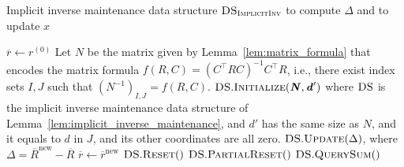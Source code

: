 \documentclass[11pt]{article}
\newcommand{\new}{\mathrm{new}}
\newcommand\dd{\boldsymbol{\mathit{d}}}
\newcommand\rr{\boldsymbol{\mathit{r}}}
\newcommand\xx{\boldsymbol{\mathit{x}}}
\newcommand\CC{\boldsymbol{\mathit{C}}}
\newcommand\NN{\boldsymbol{\mathit{N}}}
\newcommand\RR{\boldsymbol{\mathit{R}}}
\newcommand{\ov}{\overline}
\begin{document}
\begin{algorithm}
\caption{Implicit inverse maintenance data structure $\textsc{DS}_{\textsc{ImplicitInv}}$ to compute $\Delta$ and to update $\xx$}\label{alg:DS_Implicit_Inv}
\begin{algorithmic}[1]
\State $\ov{\rr} \leftarrow \rr^{(0)}$
\State Let $\NN$ be the matrix given by Lemma~\ref{lem:matrix_formula} that encodes the matrix formula $f(\RR, \CC) = (\CC^{\top} \RR \CC)^{-1} \CC^{\top} \RR$, i.e., there exist index sets $I,J$ such that $(\NN^{-1})_{I,J} = f(\RR, \CC)$.
\State $\textsc{DS}.\textsc{Initialize}(\NN, \dd')$ where $\textsc{DS}$ is the implicit inverse maintenance data structure of Lemma~\ref{lem:implicit_inverse_maintenance}, and $\dd'$ has the same size as $\NN$, and it equals to $\dd$ in $J$, and its other coordinates are all zero. \label{algline:DS_implicit_inv_initialize}
\EndProcedure
\Procedure{Update}{$\ov{\rr}^{\new}$}
\State $\textsc{DS}.\textsc{Update}(\Delta)$, where $\Delta = \ov{\RR}^{\new} - \ov{\RR}$
\State $\ov{\rr} \gets \ov{\rr}^{\new}$
\State $\textsc{DS}.\textsc{Reset}()$
\State $\textsc{DS}.\textsc{PartialReset}()$
\EndIf
\EndProcedure
{}
\State \Return $\textsc{DS}.\textsc{QuerySum}()$
\EndProcedure
\end{algorithmic}
\end{algorithm}
\end{document}
